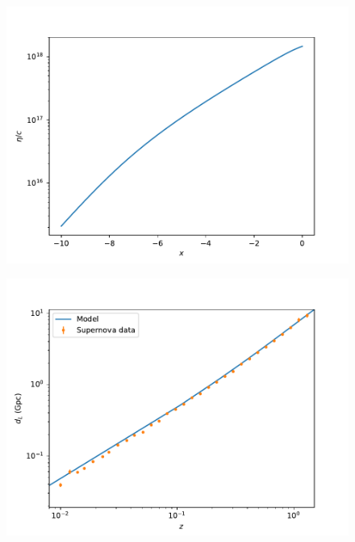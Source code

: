 \documentclass{aa}
\begin{document}
\begin{figure}[ht]
\centering
\includegraphics[width=\hsize]{figures/eta_over_c.pdf}
  \caption{}
     \label{}
\end{figure}

\begin{figure}[ht]
\centering
\includegraphics[width=\hsize]{figures/dL.pdf}
  \caption{}
     \label{}
\end{figure}
\end{document}

